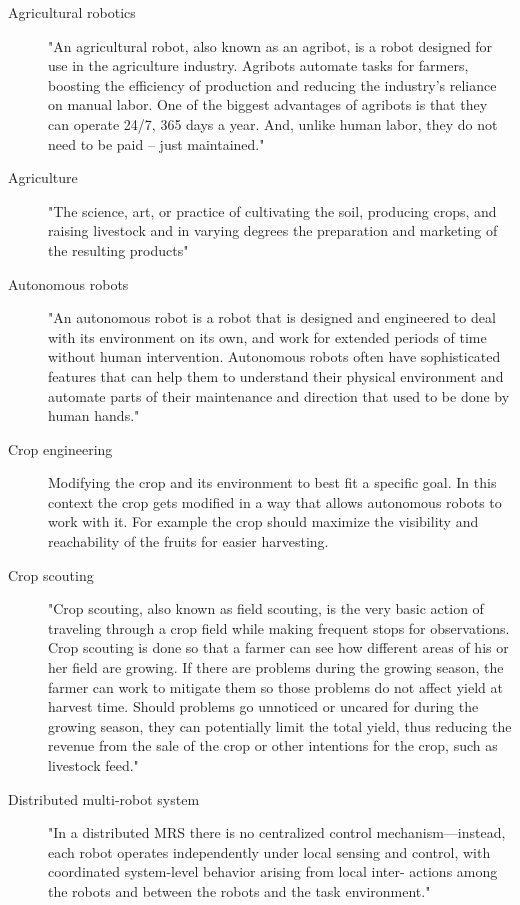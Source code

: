 \documentclass{article}
\begin{document}
\begin{description}
    \item[Agricultural robotics] "An agricultural robot, also known as an agribot, is a robot designed for use in the agriculture industry. Agribots automate tasks for farmers, boosting the efficiency of production and reducing the industry’s reliance on manual labor. One of the biggest advantages of agribots is that they can operate 24/7, 365 days a year. And, unlike human labor, they do not need to be paid – just maintained." \cite{MarketBusinessNews2020} 
    \item[Agriculture] "The science, art, or practice of cultivating the soil, producing crops, and raising livestock and in varying degrees the preparation and marketing of the resulting products" \cite{MerriamWebster2020}
    \item[Autonomous robots] "An autonomous robot is a robot that is designed and engineered to deal with its environment on its own, and work for extended periods of time without human intervention. Autonomous robots often have sophisticated features that can help them to understand their physical environment and automate parts of their maintenance and direction that used to be done by human hands." \cite{Technopedia2020}    
    \item[Crop engineering]  Modifying the crop and its environment to best fit a specific goal. In this context the crop gets modified in a way that allows autonomous robots to work with it. For example the crop should maximize the visibility and reachability of the fruits for easier harvesting.
    \item[Crop scouting]  "Crop scouting, also known as field scouting, is the very basic action of traveling through a crop field while making frequent stops for observations. Crop scouting is done so that a farmer can see how different areas of his or her field are growing. If there are problems during the growing season, the farmer can work to mitigate them so those problems do not affect yield at harvest time. Should problems go unnoticed or uncared for during the growing season, they can potentially limit the total yield, thus reducing the revenue from the sale of the crop or other intentions for the crop, such as livestock feed." \cite{Farms2020}
    \item[Distributed multi-robot system] "In a distributed MRS there is no centralized control mechanism—instead, each robot operates independently under local sensing and control, with coordinated system-level behavior arising from local inter- actions among the robots and between the robots and the task environment." \cite{Lerman2006}

\end{description}
\end{document}
